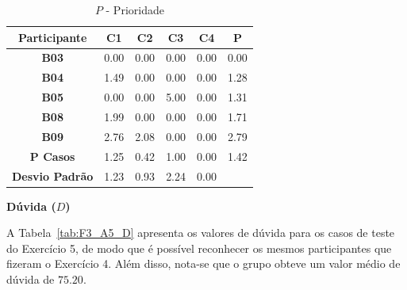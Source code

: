 \begin{table}[htbp]
	\centering
	\caption{$P$ - Prioridade}
	\begin{tabular}{|c|c|c|c|c|c}
		\hline
		\rowcolor[HTML]{D9D9D9} 
		\textbf{Participante} & \textbf{C1} & \textbf{C2} & \textbf{C3} & \textbf{C4} & \multicolumn{1}{c|}{\cellcolor[HTML]{D9D9D9}\textbf{P}} \\ \hline
		\rowcolor[HTML]{FFFFFF} 
		\textbf{B03} & 0.00 & 0.00 & 0.00 & 0.00 & \multicolumn{1}{c|}{\cellcolor[HTML]{FFFFFF}0.00} \\ \hline
		\rowcolor[HTML]{E7E6E6} 
		\textbf{B04} & 1.49 & 0.00 & 0.00 & 0.00 & \multicolumn{1}{c|}{\cellcolor[HTML]{E7E6E6}1.28} \\ \hline
		\rowcolor[HTML]{FFFFFF} 
		\textbf{B05} & 0.00 & 0.00 & 5.00 & 0.00 & \multicolumn{1}{c|}{\cellcolor[HTML]{FFFFFF}1.31} \\ \hline
		\rowcolor[HTML]{E7E6E6} 
		\textbf{B08} & 1.99 & 0.00 & 0.00 & 0.00 & \multicolumn{1}{c|}{\cellcolor[HTML]{E7E6E6}1.71} \\ \hline
		\rowcolor[HTML]{FFFFFF} 
		\textbf{B09} & 2.76 & 2.08 & 0.00 & 0.00 & \multicolumn{1}{c|}{\cellcolor[HTML]{FFFFFF}2.79} \\ \hline
		\rowcolor[HTML]{D0CECE} 
		\textbf{P Casos} & 1.25 & 0.42 & 1.00 & 0.00 & \multicolumn{1}{c|}{\cellcolor[HTML]{D0CECE}1.42} \\ \hline
		\cellcolor[HTML]{FFFFFF}\textbf{Desvio Padrão} & \cellcolor[HTML]{FFFFFF}1.23 & \cellcolor[HTML]{FFFFFF}0.93 & \cellcolor[HTML]{FFFFFF}2.24 & \cellcolor[HTML]{FFFFFF}0.00 & \multicolumn{1}{l}{} \\ \cline{1-5}
	\end{tabular}
	\label{tab:F3_A5_P}
\end{table}

\textbf{Dúvida ($D$)}

A Tabela~\ref{tab:F3_A5_D} apresenta os valores de dúvida para os casos de teste do Exercício 5, de modo que é possível reconhecer os mesmos participantes que fizeram o Exercício 4. Além disso, nota-se que o grupo obteve um valor médio de dúvida de $75.20$.

